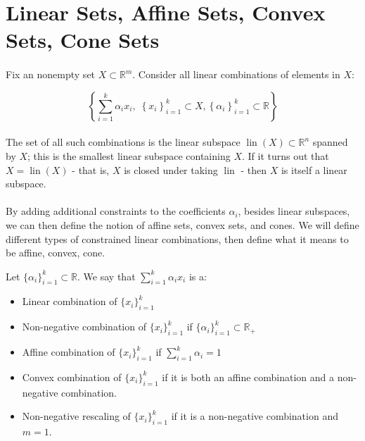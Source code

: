 \section{Linear Sets, Affine Sets, Convex Sets, Cone Sets}
\label{sect:011}

\paragraph{}Fix an nonempty set $X\subset \mathbb{R}^m$. Consider all linear combinations of elements in $X$:

\[
	\left\{\sum_{i=1}^k \alpha_i x_i,\; \left\{ x_i \right\}_{i=1}^k \subset X, \left\{\alpha_i\right\}_{i=1}^k\subset \mathbb{R}\right\}
\]

\paragraph{}The set of all such combinations is the linear subspace $\operatorname{lin}(X)\subset \mathbb{R}^n$ spanned by $X$; this is the smallest linear subspace containing $X$. If it turns out that $X=\operatorname{lin}(X)$ - that is, $X$ is closed under taking $\operatorname{lin}$ - then $X$ is itself a linear subspace.

\paragraph{}By adding additional constraints to the coefficients $\alpha_i$, besides linear subspaces, we can then define the notion of affine sets, convex sets, and cones. We will define different types of constrained linear combinations, then define what it means to be affine, convex, cone.

\begin{defn}[Combinations]\label{defn:011-comb}
	Let $\{\alpha_i\}_{i=1}^k\subset \mathbb{R}$. We say that $\sum_{i=1}^k \alpha_i x_i$ is a:
	\begin{itemize}
		\item Linear combination of $\{ x_i \}_{i=1}^k$
		\item Non-negative combination of $\{ x_i \}_{i=1}^k$ if $\{\alpha_i\}_{i=1}^k\subset \mathbb{R}_+$
		\item Affine combination of $\{ x_i \}_{i=1}^k$ if $\sum_{i=1}^k \alpha_i=1$
		\item Convex combination of $\{ x_i \}_{i=1}^k$ if it is both an affine combination and a non-negative combination.
		\item Non-negative rescaling of $\{ x_i \}_{i=1}^k$ if it is a non-negative combination and $m=1$.
	\end{itemize}
\end{defn}

